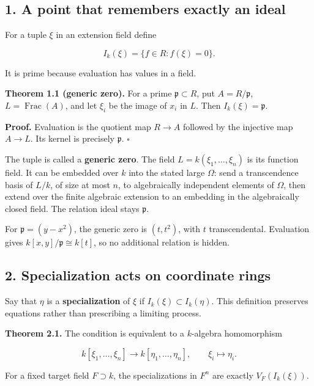 \documentclass[
]{article}
\begin{document}
\subsection{1. A point that remembers exactly an
ideal}\label{a-point-that-remembers-exactly-an-ideal}

For a tuple \(\xi\) in an extension field define

\[
I_k(\xi)=\{f\in R:f(\xi)=0\}.
\]

It is prime because evaluation has values in a field.

\textbf{Theorem 1.1 (generic zero).} For a prime
\(\mathfrak p\subset R\), put \(A=R/\mathfrak p\),
\(L=\operatorname{Frac}(A)\), and let \(\xi_i\) be the image of \(x_i\)
in \(L\). Then \(I_k(\xi)=\mathfrak p\).

\textbf{Proof.} Evaluation is the quotient map \(R\to A\) followed by
the injective map \(A\to L\). Its kernel is precisely \(\mathfrak p\).
\(\square\)

The tuple is called a \textbf{generic zero}. The field
\(L=k(\xi_1,\ldots,\xi_n)\) is its function field. It can be embedded
over \(k\) into the stated large \(\Omega\): send a transcendence basis
of \(L/k\), of size at most \(n\), to algebraically independent elements
of \(\Omega\), then extend over the finite algebraic extension to an
embedding in the algebraically closed field. The relation ideal stays
\(\mathfrak p\).

For \(\mathfrak p=(y-x^2)\), the generic zero is \((t,t^2)\), with \(t\)
transcendental. Evaluation gives \(k[x,y]/\mathfrak p\cong k[t]\), so no
additional relation is hidden.

\subsection{2. Specialization acts on coordinate
rings}\label{specialization-acts-on-coordinate-rings}

Say that \(\eta\) is a \textbf{specialization} of \(\xi\) if
\(I_k(\xi)\subset I_k(\eta)\). This definition preserves equations
rather than prescribing a limiting process.

\textbf{Theorem 2.1.} The condition is equivalent to a \(k\)-algebra
homomorphism

\[
k[\xi_1,\ldots,\xi_n]\longrightarrow k[\eta_1,\ldots,\eta_n],
\qquad \xi_i\longmapsto\eta_i.
\]

For a fixed target field \(F\supset k\), the specializations in \(F^n\)
are exactly \(V_F(I_k(\xi))\).
\end{document}
